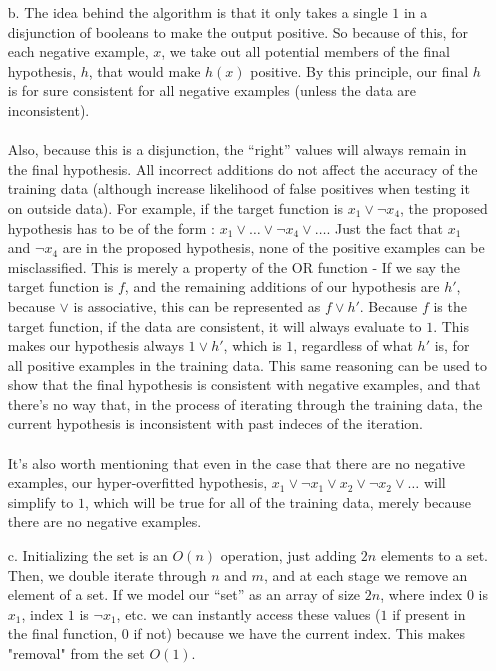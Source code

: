 \begin{enumerate}
\begin{enumerate}
		\item[b.]
			The idea behind the algorithm is that it only takes a single $1$ in a disjunction of booleans to make the output positive. So because of this, for each negative example, $x$, we take out all potential members of the final hypothesis, $h$, that would make $h(x)$ positive. By this principle, our final $h$ is for sure consistent for all negative examples (unless the data are inconsistent).\\\\ 
			Also, because this is a disjunction, the ``right'' values will always remain in the final hypothesis. All incorrect additions do not affect the accuracy of the training data (although increase likelihood of false positives when testing it on outside data). For example, if the target function is $x_1 \vee \neg x_4$, the proposed hypothesis has to be of the form : $x_1 \vee \ldots \vee \neg x_4 \vee \ldots$. Just the fact that $x_1$ and $\neg x_4$ are in the proposed hypothesis, none of the positive examples can be misclassified. This is merely a property of the OR function - If we say the target function is $f$, and the remaining additions of our hypothesis are $h'$, because $\vee$ is associative, this can be represented as $f \vee h'$. Because $f$ is the target function, if the data are consistent, it will always evaluate to $1$. This makes our hypothesis always $1 \vee h'$, which is $1$, regardless of what $h'$ is, for all positive examples in the training data. This same reasoning can be used to show that the final hypothesis is consistent with negative examples, and that there's no way that, in the process of iterating through the training data, the current hypothesis is inconsistent with past indeces of the iteration.\\\\
		It's also worth mentioning that even in the case that there are no negative examples, our hyper-overfitted hypothesis, $x_1 \vee \neg x_1 \vee x_2 \vee \neg x_2 \vee \ldots$ will simplify to $1$, which will be true for all of the training data, merely because there are no negative examples. 
		\item[c.]
			Initializing the set is an $O(n)$ operation, just adding $2n$ elements to a set.\\
			Then, we double iterate through $n$ and $m$, and at each stage we remove an element of a set.
			If we model our ``set'' as an array of size $2n$, where index $0$ is $x_1$, index $1$ is $\neg x_1$, etc. we can instantly access these values ($1$ if present in the final function, $0$ if not) because we have the current index. This makes "removal" from the set $O(1)$.

\end{enumerate}
\end{enumerate}

